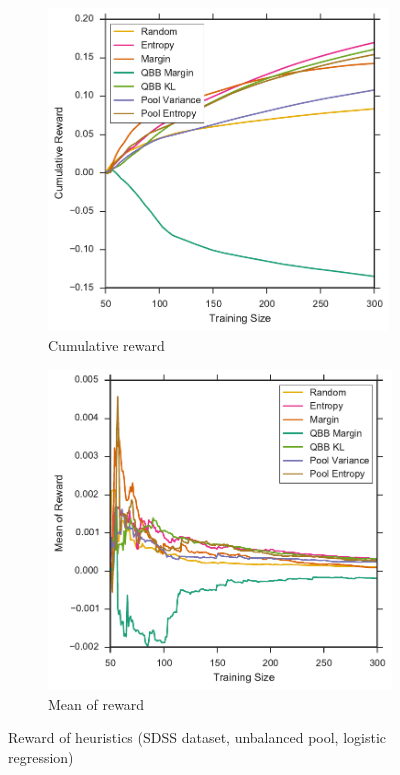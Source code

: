 \begin{figure}[p]
	\centering
	\begin{subfigure}{.5\textwidth}
		\centering
		\includegraphics[width=0.99\textwidth]{figures/5_thompson/sdss_ul_sum_rewards}
		\caption{Cumulative reward}
		\label{fig:sdss_ul_sum_rewards}
	\end{subfigure}%
	\begin{subfigure}{.5\textwidth}
		\centering
		\includegraphics[width=0.99\linewidth]{figures/5_thompson/sdss_ul_avg_rewards}
		\caption{Mean of reward}
		\label{fig:sdss_ul_avg_rewards}
	\end{subfigure}
	\caption[Reward of heuristics (SDSS, unbalanced, logistic)]{
		Reward of heuristics (SDSS dataset, unbalanced pool, logistic regression)}
	\label{fig:sdss_ul_rewards}
\end{figure}


